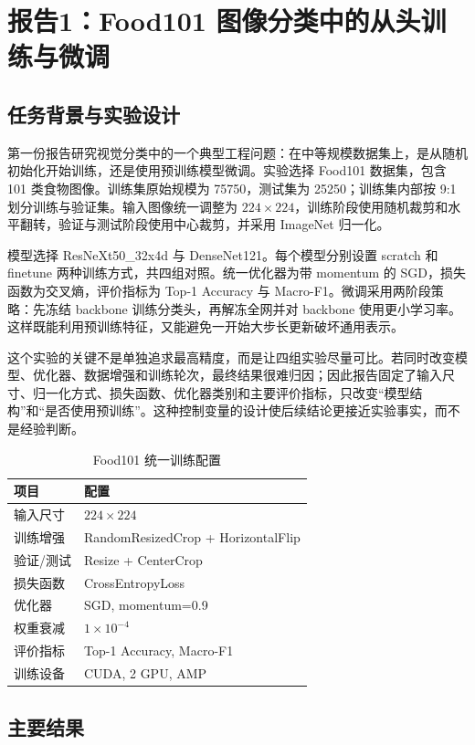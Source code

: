 \documentclass[a4paper,11pt,twocolumn]{article}
\begin{document}
\section{报告1：Food101 图像分类中的从头训练与微调}

\subsection{任务背景与实验设计}

第一份报告研究视觉分类中的一个典型工程问题：在中等规模数据集上，是从随机初始化开始训练，还是使用预训练模型微调。实验选择 Food101 数据集，包含 101 类食物图像。训练集原始规模为 75750，测试集为 25250；训练集内部按 9:1 划分训练与验证集。输入图像统一调整为 $224\times224$，训练阶段使用随机裁剪和水平翻转，验证与测试阶段使用中心裁剪，并采用 ImageNet 归一化。

模型选择 ResNeXt50\_32x4d 与 DenseNet121。每个模型分别设置 scratch 和 finetune 两种训练方式，共四组对照。统一优化器为带 momentum 的 SGD，损失函数为交叉熵，评价指标为 Top-1 Accuracy 与 Macro-F1。微调采用两阶段策略：先冻结 backbone 训练分类头，再解冻全网并对 backbone 使用更小学习率。这样既能利用预训练特征，又能避免一开始大步长更新破坏通用表示。

这个实验的关键不是单独追求最高精度，而是让四组实验尽量可比。若同时改变模型、优化器、数据增强和训练轮次，最终结果很难归因；因此报告固定了输入尺寸、归一化方式、损失函数、优化器类别和主要评价指标，只改变“模型结构”和“是否使用预训练”。这种控制变量的设计使后续结论更接近实验事实，而不是经验判断。

\begin{table}[H]
\centering
\scriptsize
\caption{Food101 统一训练配置}
\begin{tabular}{ll}
\toprule
项目 & 配置 \\
\midrule
输入尺寸 & $224\times224$ \\
训练增强 & RandomResizedCrop + HorizontalFlip \\
验证/测试 & Resize + CenterCrop \\
损失函数 & CrossEntropyLoss \\
优化器 & SGD, momentum=0.9 \\
权重衰减 & $1\times10^{-4}$ \\
评价指标 & Top-1 Accuracy, Macro-F1 \\
训练设备 & CUDA, 2 GPU, AMP \\
\bottomrule
\end{tabular}
\end{table}

\subsection{主要结果}
\end{document}
